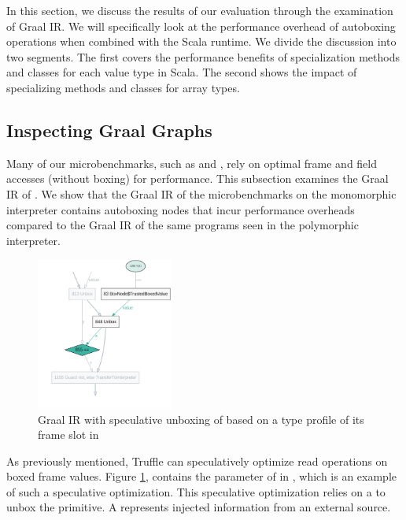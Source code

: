 In this section, we discuss the results of our evaluation through the examination of Graal IR.
We will specifically look at the performance overhead of autoboxing operations when combined with the Scala runtime.
We divide the discussion into two segments.
The first covers the performance benefits of specialization methods and classes for each value type in Scala.
The second shows the impact of specializing methods and classes for array types.

\subsection{Inspecting Graal Graphs}

Many of our microbenchmarks, such as  and , rely on optimal frame and field accesses (without boxing) for performance.
This subsection examines the Graal IR of .
We show that the Graal IR of the microbenchmarks on the monomorphic interpreter contains autoboxing nodes that incur performance overheads compared to the Graal IR of the same programs seen in the polymorphic interpreter.

\begin{figure}[!htb]
	\centering
	\includegraphics[width=0.4\textwidth]{figures/dot/List.contains.boxed-param-read.TruffleTier.png}
	\caption{Graal IR with speculative unboxing of  based on a type profile of its frame slot in }
	\label{graalir:cons-contains-param-read}
\end{figure}

As previously mentioned, Truffle can speculatively optimize read operations on boxed frame values.
Figure \ref{graalir:cons-contains-param-read}, contains the parameter of  in , which is an example of such a speculative optimization.
This speculative optimization relies on a  to unbox the primitive.
A  represents injected information from an external source.

